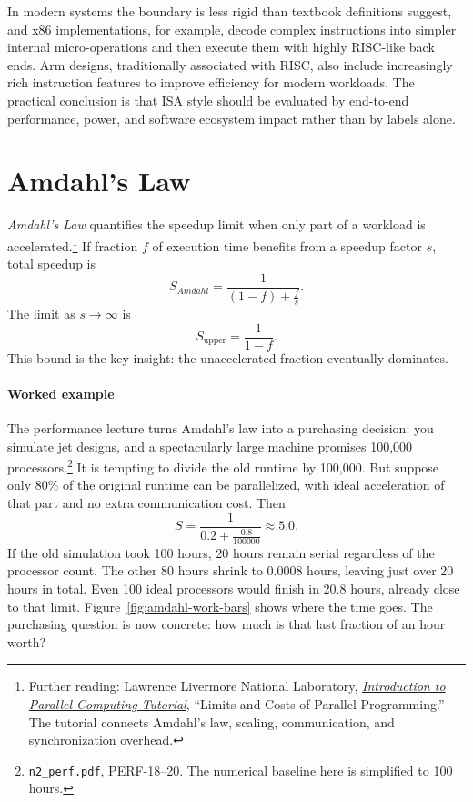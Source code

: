 In modern systems the boundary is less rigid than textbook definitions suggest, and x86 implementations, for example, decode complex instructions into simpler internal micro-operations and then execute them with highly RISC-like back ends.
Arm designs, traditionally associated with RISC, also include increasingly rich instruction features to improve efficiency for modern workloads.
The practical conclusion is that ISA style should be evaluated by end-to-end performance, power, and software ecosystem impact rather than by labels alone.


\section{Amdahl's Law}\label{sec:auto-014}
\textit{Amdahl's Law} quantifies the speedup limit when only part of a workload is accelerated.\footnote{Further reading: Lawrence Livermore National Laboratory, \href{https://hpc.llnl.gov/documentation/tutorials/introduction-parallel-computing-tutorial}{\emph{Introduction to Parallel Computing Tutorial}}, ``Limits and Costs of Parallel Programming.'' The tutorial connects Amdahl's law, scaling, communication, and synchronization overhead.}
If fraction $f$ of execution time benefits from a speedup factor $s$, total speedup is
\begin{equation}\label{eq:auto-010}
    S_{Amdahl}=\frac{1}{(1-f)+\frac{f}{s}}.
\end{equation}
The limit as $s\to\infty$ is
\begin{equation}\label{eq:auto-011}
    S_{\text{upper}}=\frac{1}{1-f}.
\end{equation}
This bound is the key insight: the unaccelerated fraction eventually dominates.

\paragraph{Worked example}\label{par:auto-010}
The performance lecture turns Amdahl's law into a purchasing decision: you simulate jet designs, and a spectacularly large machine promises 100{,}000 processors.\footnote{\texttt{n2\_perf.pdf}, PERF-18--20. The numerical baseline here is simplified to 100 hours.}
It is tempting to divide the old runtime by 100{,}000.
But suppose only 80\% of the original runtime can be parallelized, with ideal acceleration of that part and no extra communication cost.
Then
\begin{equation}\label{eq:auto-012}
    S=\frac{1}{0.2+\frac{0.8}{100000}}\approx 5.0.
\end{equation}
If the old simulation took 100 hours, 20 hours remain serial regardless of the processor count.
The other 80 hours shrink to 0.0008 hours, leaving just over 20 hours in total.
Even 100 ideal processors would finish in 20.8 hours, already close to that limit.
Figure~\ref{fig:amdahl-work-bars} shows where the time goes.
The purchasing question is now concrete: how much is that last fraction of an hour worth?


